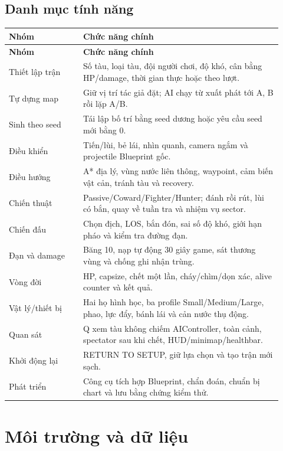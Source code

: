 \section{Danh mục tính năng}
\begin{longtable}{@{}p{0.25\linewidth}p{0.67\linewidth}@{}}
\toprule
\textbf{Nhóm} & \textbf{Chức năng chính}\\ \midrule
\endfirsthead
\toprule
\textbf{Nhóm} & \textbf{Chức năng chính}\\ \midrule
\endhead
Thiết lập trận & Số tàu, loại tàu, đội người chơi, độ khó, cân bằng HP/damage, thời gian thực hoặc theo lượt.\\
Tự dựng map & Giữ vị trí tác giả đặt; AI chạy từ xuất phát tới A, B rồi lặp A/B.\\
Sinh theo seed & Tái lập bố trí bằng seed dương hoặc yêu cầu seed mới bằng 0.\\
Điều khiển & Tiến/lùi, bẻ lái, nhìn quanh, camera ngắm và projectile Blueprint gốc.\\
Điều hướng & A* địa lý, vùng nước liên thông, waypoint, cảm biến vật cản, tránh tàu và recovery.\\
Chiến thuật & Passive/Coward/Fighter/Hunter; đánh rồi rút, lùi có bắn, quay về tuần tra và nhiệm vụ sector.\\
Chiến đấu & Chọn địch, LOS, bắn đón, sai số độ khó, giới hạn pháo và kiểm tra đường đạn.\\
Đạn và damage & Băng 10, nạp tự động 30 giây game, sát thương vùng và chống ghi nhận trùng.\\
Vòng đời & HP, capsize, chết một lần, cháy/chìm/dọn xác, alive counter và kết quả.\\
Vật lý/thiết bị & Hai họ hình học, ba profile Small/Medium/Large, phao, lực đẩy, bánh lái và cản nước thụ động.\\
Quan sát & Q xem tàu không chiếm AIController, toàn cảnh, spectator sau khi chết, HUD/minimap/healthbar.\\
Khởi động lại & RETURN TO SETUP, giữ lựa chọn và tạo trận mới sạch.\\
Phát triển & Công cụ tích hợp Blueprint, chẩn đoán, chuẩn bị chart và lưu bằng chứng kiểm thử.\\
\bottomrule
\end{longtable}

\chapter{Môi trường và dữ liệu}
\label{chap:moitruong}

